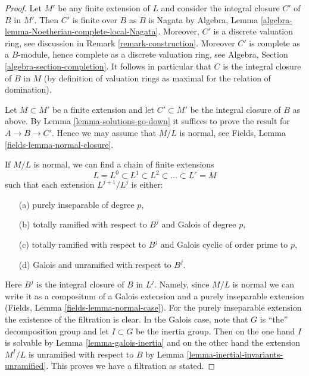 \begin{proof}
Let $M'$ be any finite extension of $L$ and consider the integral closure
$C'$ of $B$ in $M'$. Then $C'$ is finite over $B$ as $B$ is Nagata by
Algebra, Lemma \ref{algebra-lemma-Noetherian-complete-local-Nagata}.
Moreover, $C'$ is a discrete valuation ring, see discussion in
Remark \ref{remark-construction}. Moreover $C'$ is complete as a
$B$-module, hence complete as a discrete valuation ring, see
Algebra, Section \ref{algebra-section-completion}.
It follows in particular that $C$ is the integral
closure of $B$ in $M$ (by definition of valuation rings as maximal
for the relation of domination).

\medskip\noindent
Let $M \subset M'$ be a finite extension and let $C' \subset M'$
be the integral closure of $B$ as above. By
Lemma \ref{lemma-solutions-go-down}
it suffices to prove the result for $A \to B \to C'$.
Hence we may assume that $M/L$ is normal, see
Fields, Lemma \ref{fields-lemma-normal-closure}.

\medskip\noindent
If $M / L$ is normal, we can find a chain of finite extensions
$$
L = L^0 \subset L^1 \subset L^2 \subset \ldots \subset L^r = M
$$
such that each extension $L^{j + 1}/L^j$ is either:
\begin{enumerate}
\item[(a)] purely inseparable of degree $p$,
\item[(b)] totally ramified with respect to $B^j$ and Galois of degree $p$,
\item[(c)] totally ramified with respect to $B^j$ and Galois cyclic of
order prime to $p$,
\item[(d)] Galois and unramified with respect to $B^j$.
\end{enumerate}
Here $B^j$ is the integral closure of $B$ in $L^j$.
Namely, since $M/L$ is normal we can write it as a compositum of
a Galois extension and a purely inseparable extension
(Fields, Lemma \ref{fields-lemma-normal-case}).
For the purely inseparable extension the existence of the filtration
is clear. In the Galois case, note that $G$ is ``the'' decomposition group
and let $I \subset G$ be the inertia group. Then on the one hand
$I$ is solvable by Lemma \ref{lemma-galois-inertia} and on the other
hand the extension $M^I/L$ is unramified with respect to $B$ by
Lemma \ref{lemma-inertial-invariants-unramified}.
This proves we have a filtration as stated.


\end{proof}
